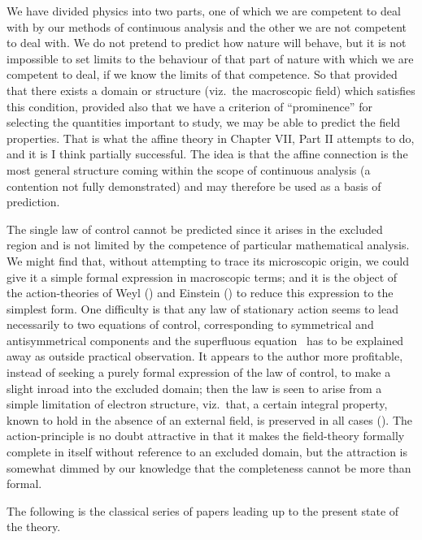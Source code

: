 \documentclass[12pt]{book}
\begin{document}
We have divided physics into two parts, one of which we are competent to deal with by our methods of continuous
analysis and the other we are not competent to deal with.
We do not pretend to predict  how nature will behave, but it is not impossible to set limits
to the behaviour of that part of nature with which we are competent to deal, if we know the limits of that competence.
So that provided that there exists a domain or structure (viz.\ the macroscopic field) which satisfies this condition,
provided also that we have a criterion of ``prominence'' for selecting the quantities important to study,
we may be able to predict the field properties.
That is what the affine theory in Chapter VII, Part II attempts to do, and it is I think partially successful.
The idea is that the affine connection is the most general structure coming within the scope of continuous analysis
(a contention not fully demonstrated) and may therefore be used as a basis of prediction.

The single law of control cannot be predicted  since it arises in the excluded region and is not
limited by the competence of particular mathematical analysis.
We might find that, without attempting to trace its microscopic origin, we could give it a simple formal expression
in macroscopic terms; and it is the object of the action\hyp{}theories of Weyl () and Einstein ()
to reduce this expression to the simplest form.
One difficulty is that any law of stationary action seems to lead necessarily to two equations of control,
corresponding to symmetrical and antisymmetrical components and the superfluous equation~
has to be explained away as outside practical observation.
It appears to the author more profitable, instead of seeking a purely formal expression of the law of control,
to make a slight inroad into the excluded domain; then the law is seen to arise from a simple limitation of electron
structure, viz.\ that, a certain integral property, known to hold in the absence of an external field, is preserved
in all cases ().
The action\hyp{}principle is no doubt attractive in that it makes the field\hyp{}theory formally complete in itself without
reference to an excluded domain, but the attraction is somewhat dimmed by our knowledge that the completeness cannot
be more than formal.


The following is the classical series of papers leading up to the present state of the theory.
\end{document}

